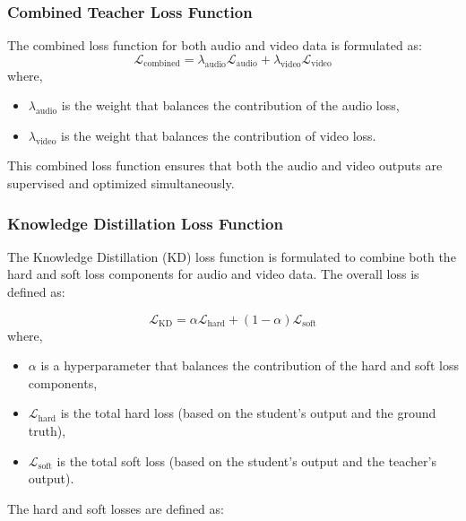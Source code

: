        \subsubsection{Combined Teacher Loss Function}
        The combined loss function for both audio and video data is formulated as:
        \begin{equation}
            \mathcal{L}_{\text{combined}} = \lambda_{\text{audio}} \mathcal{L}_{\text{audio}} + \lambda_{\text{video}} \mathcal{L}_{\text{video}}
            \end{equation}
            where,
            \begin{itemize}
                \item \( \lambda_{\text{audio}} \) is the weight that balances the contribution of the audio loss,
                \item \( \lambda_{\text{video}} \) is the weight that balances the contribution of video loss.
            \end{itemize}
    This combined loss function ensures that both the audio and video outputs are supervised and optimized simultaneously.

    \subsubsection{Knowledge Distillation Loss Function}
    The Knowledge Distillation (KD) loss function is formulated to combine both the hard and soft loss components for audio and video data. The overall loss is defined as:

    \begin{equation}
        \mathcal{L}_{\text{KD}} = \alpha \mathcal{L}_{\text{hard}} + (1 - \alpha) \mathcal{L}_{\text{soft}}
    \end{equation}
    where,

    \begin{itemize}
        \item \( \alpha \) is a hyperparameter that balances the contribution of the hard and soft loss components,
        \item \( \mathcal{L}_{\text{hard}} \) is the total hard loss (based on the student's output and the ground truth),
        \item \( \mathcal{L}_{\text{soft}} \) is the total soft loss (based on the student's output and the teacher's output).
    \end{itemize}

    The hard and soft losses are defined as:

